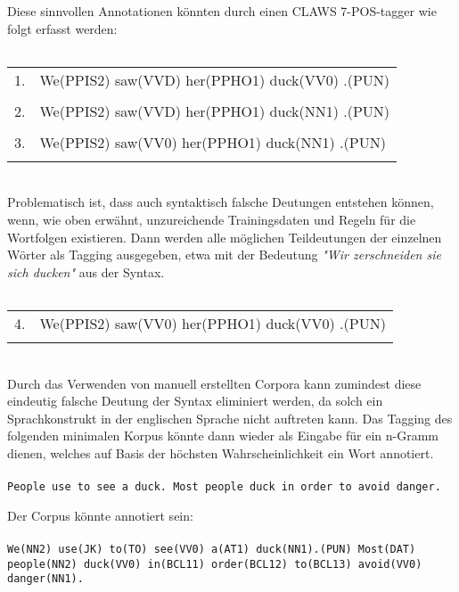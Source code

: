 \documentclass[12pt]{report}
\begin{document}
Diese sinnvollen Annotationen könnten durch einen CLAWS 7-POS-tagger wie folgt erfasst werden:
\\ \tt
\begin{tabular}{ll} 
\\
1. & We(PPIS2) saw(VVD) her(PPHO1) duck(VV0) .(PUN) \\
\\
2. & We(PPIS2) saw(VVD) her(PPHO1) duck(NN1) .(PUN) \\
\\
3. & We(PPIS2) saw(VV0) her(PPHO1) duck(NN1) .(PUN) \\
\\
\end{tabular} 
\\ \rm
Problematisch ist, dass auch syntaktisch falsche Deutungen entstehen können, wenn, wie oben erwähnt, unzureichende Trainingsdaten und Regeln für die Wortfolgen existieren. Dann werden alle möglichen Teildeutungen der einzelnen Wörter als Tagging ausgegeben, etwa mit der Bedeutung \textit{"Wir zerschneiden sie sich ducken"} aus der Syntax.
\\ \tt
\begin{tabular}{ll} 
\\
4. & We(PPIS2) saw(VV0) her(PPHO1) duck(VV0) .(PUN)\\
\\
\end{tabular} 
\\ \rm
Durch das Verwenden von manuell erstellten Corpora kann zumindest diese eindeutig falsche Deutung der Syntax eliminiert werden, da solch ein Sprachkonstrukt in der englischen Sprache nicht auftreten kann. Das Tagging des folgenden minimalen Korpus könnte dann wieder als Eingabe für ein n-Gramm dienen, welches auf Basis der höchsten Wahrscheinlichkeit ein Wort annotiert.
\\ \tt
\\
People use to see a duck. Most people duck in order to avoid danger.
\rm

Der Corpus könnte annotiert sein:
\\ \tt
\\
We(NN2) use(JK) to(TO) see(VV0) a(AT1) duck(NN1).(PUN) Most(DAT) people(NN2) duck(VV0) in(BCL11) order(BCL12) to(BCL13) avoid(VV0) danger(NN1).
\\ \rm
\end{document}
